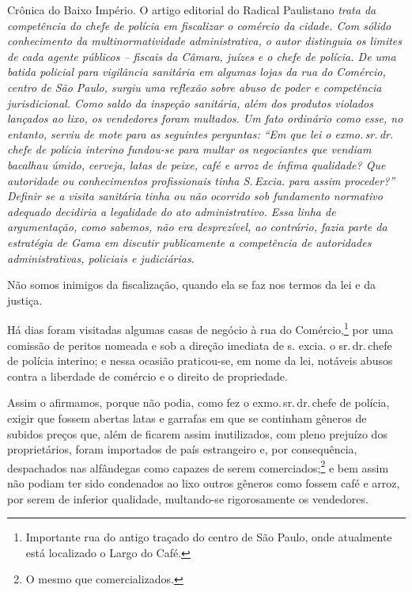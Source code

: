 \begin{didascalia}
Crônica do Baixo Império. O artigo editorial do Radical Paulistano
\emph{trata da competência do chefe de polícia em fiscalizar o comércio
da cidade. Com sólido conhecimento da multinormatividade administrativa,
o autor distinguia os limites de cada agente públicos -- fiscais da
Câmara, juízes e o chefe de polícia. De uma batida policial para
vigilância sanitária em algumas lojas da rua do Comércio, centro de São
Paulo, surgiu uma reflexão sobre abuso de poder e competência
jurisdicional. Como saldo da inspeção sanitária, além dos produtos
violados lançados ao lixo, os vendedores foram multados. Um fato
ordinário como esse, no entanto, serviu de mote para as seguintes
perguntas: ``Em que lei o exmo.\,sr.\,dr.\,chefe de polícia interino
fundou-se para multar os negociantes que vendiam bacalhau úmido,
cerveja, latas de peixe, café e arroz de ínfima qualidade? Que
autoridade ou conhecimentos profissionais tinha S.\,Excia. para assim
proceder?'' Definir se a visita sanitária tinha ou não ocorrido sob
fundamento normativo adequado decidiria a legalidade do ato
administrativo. Essa linha de argumentação, como sabemos, não era
desprezível, ao contrário, fazia parte da estratégia de Gama em discutir
publicamente a competência de autoridades administrativas, policiais e
judiciárias.}
\end{didascalia}



Não somos inimigos da fiscalização, quando ela se faz nos termos da lei
e da justiça.

Há dias foram visitadas algumas casas de negócio à rua do
Comércio,\footnote{Importante rua do antigo traçado do centro de São
  Paulo, onde atualmente está localizado o Largo do Café.} por uma
comissão de peritos nomeada e sob a direção imediata de s. excia. o sr.\,dr.\,chefe de polícia interino; e nessa ocasião praticou-se, em nome da
lei, notáveis abusos contra a liberdade de comércio e o direito de
propriedade.

Assim o afirmamos, porque não podia, como fez o exmo.\,sr.\,dr.\,chefe de
polícia, exigir que fossem abertas latas e garrafas em que se continham
gêneros de subidos preços que, além de ficarem assim inutilizados, com
pleno prejuízo dos proprietários, foram importados de país estrangeiro
e, por consequência, despachados nas alfândegas como capazes de serem
comerciados;\footnote{O mesmo que comercializados.} e bem assim não
podiam ter sido condenados ao lixo outros gêneros como fossem café e
arroz, por serem de inferior qualidade, multando-se rigorosamente os
vendedores.

